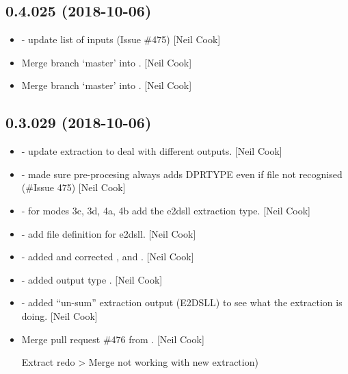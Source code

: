 \documentclass[a4paper,10pt,english]{report}
\begin{document}
\subsection{0.4.025 (2018-10-06)}
\label{\detokenize{misc/changelog:id301}}\begin{itemize}
\item {} 
 - update list of inputs (Issue \#475) {[}Neil Cook{]}

\item {} 
Merge branch ‘master’ into . {[}Neil Cook{]}

\item {} 
Merge branch ‘master’ into . {[}Neil Cook{]}

\end{itemize}


\subsection{0.3.029 (2018-10-06)}
\label{\detokenize{misc/changelog:id302}}\begin{itemize}
\item {} 
 - update extraction to deal with different
outputs. {[}Neil Cook{]}

\item {} 
 - made sure pre-procesing always adds DPRTYPE even if
file not recognised (\#Issue 475) {[}Neil Cook{]}

\item {} 
 - for modes 3c, 3d, 4a, 4b add the e2dsll extraction
type. {[}Neil Cook{]}

\item {} 
 - add file definition for e2dsll. {[}Neil Cook{]}

\item {} 
 - added and corrected ,  and
. {[}Neil Cook{]}

\item {} 
 - added output type . {[}Neil Cook{]}

\item {} 
 - added “un-sum” extraction output (E2DSLL)
to see what the extraction is doing. {[}Neil Cook{]}

\item {} 
Merge pull request \#476 from . {[}Neil Cook{]}

Extract redo \textendash{}\textgreater{} Merge  not working with new extraction)

\end{itemize}
\end{document}
